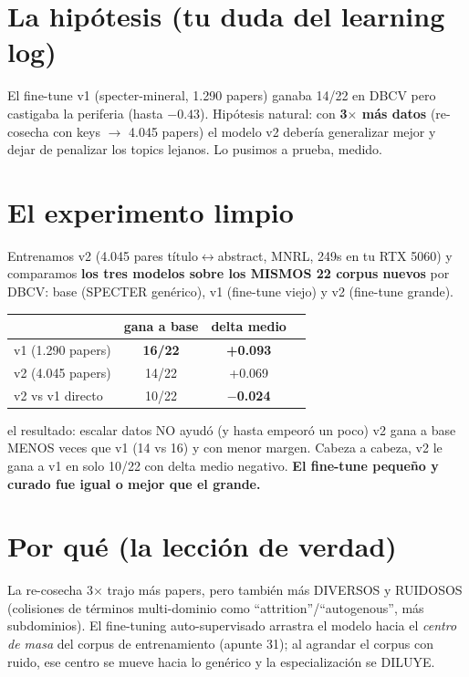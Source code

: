 \documentclass[11pt,a4paper]{article}
\begin{document}

\section{La hipótesis (tu duda del learning log)}

El fine-tune v1 (specter-mineral, 1.290 papers) ganaba 14/22 en DBCV pero castigaba la
periferia (hasta $-0.43$). Hipótesis natural: con \textbf{3$\times$ más datos}
(re-cosecha con keys $\to$ 4.045 papers) el modelo v2 debería generalizar mejor y dejar
de penalizar los topics lejanos. Lo pusimos a prueba, medido.

\section{El experimento limpio}

Entrenamos v2 (4.045 pares título$\leftrightarrow$abstract, MNRL, 249s en tu RTX 5060) y
comparamos \textbf{los tres modelos sobre los MISMOS 22 corpus nuevos} por DBCV: base
(SPECTER genérico), v1 (fine-tune viejo) y v2 (fine-tune grande).

\begin{center}
\begin{tabular}{lccc}
 & gana a base & delta medio \\
\hline
v1 (1.290 papers) & \textbf{16/22} & \textbf{+0.093} \\
v2 (4.045 papers) & 14/22 & +0.069 \\
v2 vs v1 directo & 10/22 & \textbf{$-$0.024} \\
\end{tabular}
\end{center}

\begin{concepto}{el resultado: escalar datos NO ayudó (y hasta empeoró un poco)}
v2 gana a base MENOS veces que v1 (14 vs 16) y con menor margen. Cabeza a cabeza,
v2 le gana a v1 en solo 10/22 con delta medio negativo. \textbf{El fine-tune pequeño y
curado fue igual o mejor que el grande.}
\end{concepto}

\section{Por qué (la lección de verdad)}

La re-cosecha 3$\times$ trajo más papers, pero también más DIVERSOS y RUIDOSOS
(colisiones de términos multi-dominio como ``attrition''/``autogenous'', más subdominios).
El fine-tuning auto-supervisado arrastra el modelo hacia el \emph{centro de masa} del
corpus de entrenamiento (apunte 31); al agrandar el corpus con ruido, ese centro se
mueve hacia lo genérico y la especialización se DILUYE.
\end{document}
